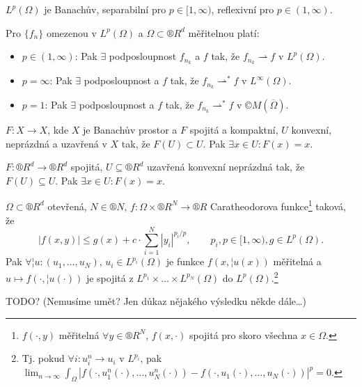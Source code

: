 \documentclass[12pt]{article}					%
\begin{document}
\begin{veta}
	$L^p(Ω)$ je Banachův, separabilní pro $p \in [1, ∞)$, reflexivní pro $p \in (1, ∞)$.

	Pro $\{f_n\}$ omezenou v $L^p(Ω)$ a $Ω \subset ®R^d$ měřitelnou platí:
	\begin{itemize}
		\item $p \in (1, ∞)$: Pak $\exists$ podposloupnost $f_{n_k}$ a $f$ tak, že $f_{n_k} \rightharpoonup f$ v $L^p(Ω)$.
		\item $p = ∞$: Pak $\exists$ podposloupnost a $f$ tak, že $f_{n_k} \rightharpoonup^* f$ v $L^∞(Ω)$.
		\item $p = 1$: Pak $\exists$ podposloupnost a $f$ tak, že $f_{n_k} \rightharpoonup^* f$ v $©M(\overline{Ω})$.
	\end{itemize}
\end{veta}

\begin{veta}
	$F: X \rightarrow X$, kde $X$ je Banachův prostor a $F$ spojitá a kompaktní, $U$ konvexní, neprázdná a uzavřená v $X$ tak, že $F(U) \subset U$. Pak $\exists x \in U: F(x) = x$.
\end{veta}

\begin{veta}
	$F: ®R^d \rightarrow ®R^d$ spojitá, $U \subseteq ®R^d$ uzavřená konvexní neprázdná tak, že $F(U) \subseteq U$. Pak $\exists x \in U: F(x) = x$.
\end{veta}

\begin{veta}[Nemytskii]
	$Ω \subset ®R^d$ otevřená, $N \in ®N$, $f: Ω \times ®R^N \rightarrow ®R$ Caratheodorova funkce\footnote{$f(·, y)$ měřitelná $\forall y \in ®R^N$, $f(x, ·)$ spojitá pro skoro všechna $x \in Ω$.} taková, že
	$$ |f(x, y)| ≤ g(x) + c·\sum_{i=1}^N |y_i|^{p_i / p}, \qquad p_i, p \in [1, ∞), g \in L^p(Ω). $$
	Pak $\forall ¦u: (u_1, …, u_N)$, $u_i \in L^{p_i}(Ω)$ je funkce $f(x, ¦u(x))$ měřitelná a $u \mapsto f(·, ¦u(·))$ je spojitá z $L^{p_1} \times … \times L^{p_N}(Ω)$ do $L^p(Ω)$.\footnote{Tj. pokud $\forall i: u_i^n \rightarrow u_i$ v $L^{p_i}$, pak $\lim_{n \rightarrow ∞} \int_Ω |f(·, u_1^n(·), …, u_N^n(·)) - f(·, u_1(·), …, u_N(·))|^p = 0$.}

	\begin{dukazin}
		TODO? (Nemusíme umět? Jen důkaz nějakého výsledku někde dále…)
	\end{dukazin}
\end{veta}
\end{document}
